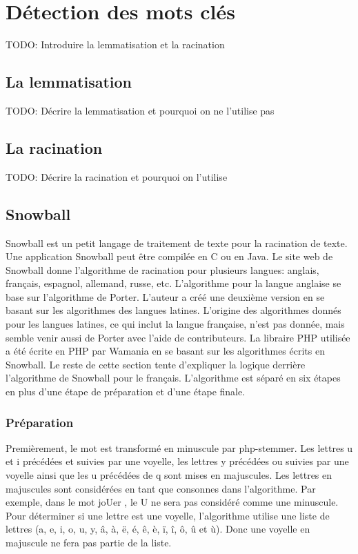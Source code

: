 \chapter{Détection des mots clés}

TODO: Introduire la lemmatisation et la racination

\section{La lemmatisation}

TODO: Décrire la lemmatisation et pourquoi on ne l'utilise pas

\section{La racination}

TODO: Décrire la racination et pourquoi on l'utilise

\section{Snowball}

Snowball est un petit langage de traitement de texte pour la racination de texte.
Une application Snowball peut être compilée en C ou en Java.
Le site web de Snowball donne l'algorithme de racination pour plusieurs langues: anglais, français, espagnol, allemand, russe, etc.
L'algorithme pour la langue anglaise se base sur l'algorithme de Porter.
L'auteur a créé une deuxième version en se basant sur les algorithmes des langues latines.
L'origine des algorithmes donnés pour les langues latines, ce qui inclut la langue française, n'est pas donnée, mais semble venir aussi de Porter avec l'aide de contributeurs.
La libraire PHP utilisée a été écrite en PHP par Wamania en se basant sur les algorithmes écrits en Snowball.
Le reste de cette section tente d'expliquer la logique derrière l'algorithme de Snowball pour le français.
L'algorithme est séparé en six étapes en plus d'une étape de préparation et d'une étape finale.

\subsection*{Préparation}

Premièrement, le mot est transformé en minuscule par php-stemmer.
Les lettres u et i précédées et suivies par une voyelle, les lettres y précédées ou suivies par une voyelle ainsi que les u précédées de q sont mises en majuscules.
Les lettres en majuscules sont considérées en tant que consonnes dans l'algorithme.
Par exemple, dans le mot \og joUer \fg{}, le U ne sera pas considéré comme une minuscule.
Pour déterminer si une lettre est une voyelle, l'algorithme utilise une liste de lettres (a, e, i, o, u, y, â, à, ë, é, ê, è, ï, î, ô, û et ù).
Donc une voyelle en majuscule ne fera pas partie de la liste.

